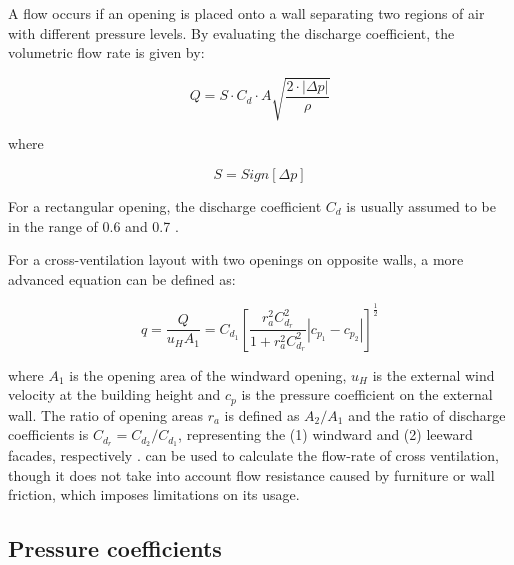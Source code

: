 A flow occurs if an opening is placed onto a wall separating two regions of air with different pressure levels.
By evaluating the discharge coefficient, the volumetric flow rate is given by:

\begin{equation}
Q  = S \cdot C_d \cdot A  \sqrt{ \dfrac{2\cdot|\Delta p|}{\rho}}
\end{equation}


where

\begin{equation}
S  = Sign [\Delta p]
\end{equation}

For a rectangular opening, the discharge coefficient $C_d$ is usually assumed to be in the range of \num{0.6} and \num{0.7} \citep{Chu2009}.



For a cross-ventilation layout with two openings on opposite walls, a more advanced equation can be defined as: 

\begin{equation}
q = \frac{Q}{u_{H} A_{1}} = C_{d_1} \left[ \frac{r_{a}^2 C_{d_r}^2 }{1+ r_{a}^2 C_{d_r}^2} |c_{p_1}-c_{p_2}| \right ] ^\frac{1}{2}
\label{eq:theory:flowrate_advanced}
\end{equation}

where $A_1$ is the opening area of the windward opening, $u_H$ is the external wind velocity at the building height and $c_p$ is the pressure coefficient on the external wall. The ratio of opening areas $r_a$ is defined as  $A_2/A_1$ and the ratio of discharge coefficients is $C_{d_r}  = C_{d_2}/C_{d_1}$, representing the (1) windward and (2) leeward facades, respectively \citep{Chu2014}.
 can be used to calculate the flow-rate of cross ventilation, though it does not take into account flow resistance caused by furniture or wall friction, which imposes limitations on its usage.

\subsection{Pressure coefficients}
\label{sec:theory:pressure_coefficients}

